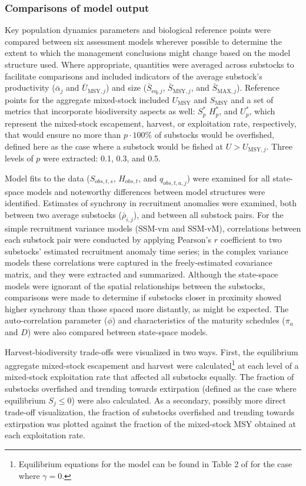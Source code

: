 \documentclass[12pt,]{book}
\let\rmarkdownfootnote\footnote%
\def\footnote{\protect\rmarkdownfootnote}
\theoremstyle{definition}
\theoremstyle{definition}
\theoremstyle{definition}
\theoremstyle{remark}
\begin{document}
\subsubsection{Comparisons of model
output}\label{comparisons-of-model-output}

\noindent
Key population dynamics parameters and biological reference points were
compared between six assessment models wherever possible to determine
the extent to which the management conclusions might change based on the
model structure used. Where appropriate, quantities were averaged across
substocks to facilitate comparisons and included indicators of the
average substock's productivity (\(\bar{\alpha}_j\) and
\(\bar{U}_{\text{MSY},j}\)) and size (\(\bar{S}_{\text{eq},j}\),
\(\bar{S}_{\text{MSY},j}\), and \(\bar{S}_{\text{MAX},j}\)). Reference
points for the aggregate mixed-stock included \(U_{\text{MSY}}\) and
\(S_{\text{MSY}}\) and a set of metrics that incorporate biodiversity
aspects as well: \(S^*_p\) \(H^*_p\), and \(U^*_p\), which represent the
mixed-stock escapement, harvest, or exploitation rate, respectively,
that would ensure no more than \(p \cdot 100\%\) of substocks would be
overfished, defined here as the case where a substock would be fished at
\(U > U_{\text{MSY},j}\). Three levels of \(p\) were extracted: 0.1,
0.3, and 0.5.

Model fits to the data (\(S_{obs,t,s}\), \(H_{obs,t}\), and
\(q_{obs,t,a,j}\)) were examined for all state-space models and
noteworthy differences between model structures were identified.
Estimates of synchrony in recruitment anomalies were examined, both
between two average substocks (\(\bar{\rho}_{i,j}\)), and between all
substock pairs. For the simple recruitment variance models (SSM-vm and
SSM-vM), correlations between each substock pair were conducted by
applying Pearson's \(r\) coefficient to two substocks' estimated
recruitment anomaly time series; in the complex variance models these
correlations were captured in the freely-estimated covariance matrix,
and they were extracted and summarized. Although the state-space models
were ignorant of the spatial relationships between the substocks,
comparisons were made to determine if substocks closer in proximity
showed higher synchrony than those spaced more distantly, as might be
expected. The auto-correlation parameter (\(\phi\)) and characteristics
of the maturity schedules (\(\pi_a\) and \(D\)) were also compared
between state-space models.

Harvest-biodiversity trade-offs were visualized in two ways. First, the
equilibrium aggregate mixed-stock escapement and harvest were
calculated\footnote{Equilibrium equations for the \citet{ricker-1954}
  model can be found in Table 2 of \citet{schnute-kronlund-2002} for the
  case where \(\gamma = 0\).} at each level of a mixed-stock
exploitation rate that affected all substocks equally. The fraction of
substocks overfished and trending towards extirpation (defined as the
case where equilibrium \(S_{j} \leq 0\)) were also calculated. As a
secondary, possibly more direct trade-off visualization, the fraction of
substocks overfished and trending towards extirpation was plotted
against the fraction of the mixed-stock MSY obtained at each
exploitation rate.
\end{document}
